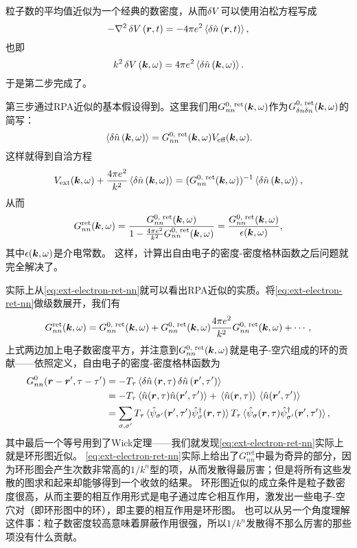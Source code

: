 \documentclass[hyperref, UTF8, a4paper]{ctexart}
\begin{document}
粒子数的平均值近似为一个经典的数密度，从而$\var{V}$可以使用泊松方程写成
\[
    - \laplacian \var{V}(\vb*{r}, t) = - 4\pi e^2 \expval*{\var{\hat{n}}(\vb*{r}, t)},
\]
也即
\begin{equation}
    k^2 \var{V}(\vb*{k}, \omega) = 4\pi e^2 \expval*{\var{\hat{n}}(\vb*{k}, \omega)}.
\end{equation}
于是第二步完成了。

第三步通过RPA近似的基本假设得到。这里我们用$G^\text{0, ret}_{nn} (\vb*{k}, \omega)$作为$G^\text{0, ret}_{\var{n}\var{n}} (\vb*{k}, \omega)$的简写：
\begin{equation}
    \expval*{\var{\hat{n}}(\vb*{k}, \omega)} = G^\text{0, ret}_{nn} (\vb*{k}, \omega) V_\text{eff} (\vb*{k}, \omega).
    \label{eq:rpa-approximation}
\end{equation}
这样就得到自洽方程
\[
    V_\text{ext}(\vb*{k}, \omega) + \frac{4\pi e^2}{k^2} \expval*{\var{\hat{n}}(\vb*{k}, \omega)} = (G^\text{0, ret}_{nn} (\vb*{k}, \omega))^{-1} \expval*{\var{\hat{n}}(\vb*{k}, \omega)},
\]
从而
\begin{equation}
    G^\text{ret}_{nn}(\vb*{k}, \omega) = \frac{G^\text{0, ret}_{nn}(\vb*{k}, \omega)}{1 - \frac{4\pi e^2}{k^2} G^\text{0, ret}_{nn}(\vb*{k}, \omega)} = \frac{G^\text{0, ret}_{nn}(\vb*{k}, \omega)}{\epsilon(\vb*{k}, \omega)},
    \label{eq:ext-electron-ret-nn}
\end{equation}
其中$\epsilon(\vb*{k}, \omega)$是介电常数。
这样，计算出自由电子的密度-密度格林函数之后问题就完全解决了。

实际上从\eqref{eq:ext-electron-ret-nn}就可以看出RPA近似的实质。将\eqref{eq:ext-electron-ret-nn}做级数展开，我们有
\[
    G^\text{ret}_{nn}(\vb*{k}, \omega) = G^\text{0, ret}_{nn}(\vb*{k}, \omega) + G^\text{0, ret}_{nn}(\vb*{k}, \omega) \frac{4\pi e^2}{k^2} G^\text{0, ret}_{nn}(\vb*{k}, \omega) + \cdots,
\]
上式两边加上电子数密度平方，并注意到$G^\text{0, ret}_{nn}(\vb*{k}, \omega)$就是电子-空穴组成的环的贡献——依照定义，自由电子的密度-密度格林函数为
\[
    \begin{aligned}
        G_{nn}^\text{0}(\vb*{r}-\vb*{r}', \tau-\tau') &= - T_\tau \expval*{\var{\hat{n}}(\vb*{r}, \tau) \var{\hat{n}}(\vb*{r}', \tau')} \\
        &= - T_\tau \expval*{{\hat{n}}(\vb*{r}, \tau) {\hat{n}}(\vb*{r}', \tau')} + \expval*{\hat{n}(\vb*{r}, \tau)} \expval*{\hat{n}(\vb*{r}', \tau')} \\
        &= \sum_{\sigma, \sigma'} T_\tau \expval*{\hat{\psi}_{\sigma'}(\vb*{r}', \tau') \hat{\psi}^\dagger_\sigma(\vb*{r}, \tau)} T_\tau \expval*{ \hat{\psi}_\sigma(\vb*{r}, \tau) \hat{\psi}^\dagger_{\sigma'}(\vb*{r}', \tau') } ,
    \end{aligned}
\]
其中最后一个等号用到了Wick定理——我们就发现\eqref{eq:ext-electron-ret-nn}实际上就是环形图近似。
\eqref{eq:ext-electron-ret-nn}实际上给出了$G^\text{ret}_{nn}$中最为奇异的部分，因为环形图会产生次数非常高的$1/k^n$型的项，从而发散得最厉害；但是将所有这些发散的图求和起来却能够得到一个收敛的结果。
环形图近似的成立条件是粒子数密度很高，从而主要的相互作用形式是电子通过库仑相互作用，激发出一些电子-空穴对（即环形图中的环），即主要的相互作用是环形图。
也可以从另一个角度理解这件事：粒子数密度较高意味着屏蔽作用很强，所以$1/k^n$发散得不那么厉害的那些项没有什么贡献。
\end{document}
